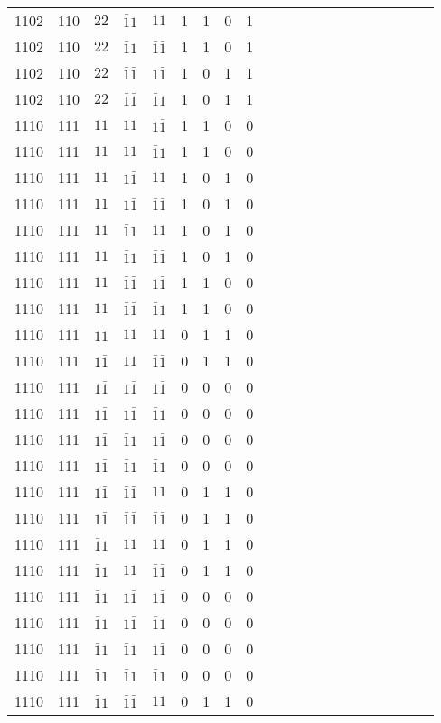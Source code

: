 \begin{longtable*}{c| cccccccccccccccccccc }
1102& 110& $22$& $\bar{1}1$& $11$& 1& 1& 0& 1\\
1102& 110& $22$& $\bar{1}1$& $\bar{1}\bar{1}$& 1& 1& 0& 1\\
1102& 110& $22$& $\bar{1}\bar{1}$& $1\bar{1}$& 1& 0& 1& 1\\
1102& 110& $22$& $\bar{1}\bar{1}$& $\bar{1}1$& 1& 0& 1& 1\\
1110& 111& $11$& $11$& $1\bar{1}$& 1& 1& 0& 0\\
1110& 111& $11$& $11$& $\bar{1}1$& 1& 1& 0& 0\\
1110& 111& $11$& $1\bar{1}$& $11$& 1& 0& 1& 0\\
1110& 111& $11$& $1\bar{1}$& $\bar{1}\bar{1}$& 1& 0& 1& 0\\
1110& 111& $11$& $\bar{1}1$& $11$& 1& 0& 1& 0\\
1110& 111& $11$& $\bar{1}1$& $\bar{1}\bar{1}$& 1& 0& 1& 0\\
1110& 111& $11$& $\bar{1}\bar{1}$& $1\bar{1}$& 1& 1& 0& 0\\
1110& 111& $11$& $\bar{1}\bar{1}$& $\bar{1}1$& 1& 1& 0& 0\\
1110& 111& $1\bar{1}$& $11$& $11$& 0& 1& 1& 0\\
1110& 111& $1\bar{1}$& $11$& $\bar{1}\bar{1}$& 0& 1& 1& 0\\
1110& 111& $1\bar{1}$& $1\bar{1}$& $1\bar{1}$& 0& 0& 0& 0\\
1110& 111& $1\bar{1}$& $1\bar{1}$& $\bar{1}1$& 0& 0& 0& 0\\
1110& 111& $1\bar{1}$& $\bar{1}1$& $1\bar{1}$& 0& 0& 0& 0\\
1110& 111& $1\bar{1}$& $\bar{1}1$& $\bar{1}1$& 0& 0& 0& 0\\
1110& 111& $1\bar{1}$& $\bar{1}\bar{1}$& $11$& 0& 1& 1& 0\\
1110& 111& $1\bar{1}$& $\bar{1}\bar{1}$& $\bar{1}\bar{1}$& 0& 1& 1& 0\\
1110& 111& $\bar{1}1$& $11$& $11$& 0& 1& 1& 0\\
1110& 111& $\bar{1}1$& $11$& $\bar{1}\bar{1}$& 0& 1& 1& 0\\
1110& 111& $\bar{1}1$& $1\bar{1}$& $1\bar{1}$& 0& 0& 0& 0\\
1110& 111& $\bar{1}1$& $1\bar{1}$& $\bar{1}1$& 0& 0& 0& 0\\
1110& 111& $\bar{1}1$& $\bar{1}1$& $1\bar{1}$& 0& 0& 0& 0\\
1110& 111& $\bar{1}1$& $\bar{1}1$& $\bar{1}1$& 0& 0& 0& 0\\
1110& 111& $\bar{1}1$& $\bar{1}\bar{1}$& $11$& 0& 1& 1& 0\\

\end{longtable*}
